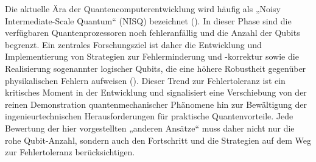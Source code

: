 \newline \newline
Die aktuelle Ära der Quantencomputerentwicklung wird häufig als „Noisy \linebreak Intermediate-Scale Quantum“ (NISQ) bezeichnet (\cite{chengNoisyIntermediatescaleQuantum2023}). In dieser Phase sind die verfügbaren Quantenprozessoren noch fehleranfällig und die Anzahl der Qubits begrenzt. Ein zentrales Forschungsziel ist daher die Entwicklung und Implementierung von Strategien zur Fehlerminderung und -korrektur sowie die Realisierung sogenannter logischer Qubits, die eine höhere Robustheit gegenüber physikalischen Fehlern aufweisen (\cite{QuantumHardwareExplained}). Dieser Trend zur Fehlertoleranz ist ein kritisches Moment in der Entwicklung und signalisiert eine Verschiebung von der reinen Demonstration quantenmechanischer Phänomene hin zur Bewältigung der ingenieurtechnischen Herausforderungen für praktische Quantenvorteile. Jede Bewertung der hier vorgestellten „anderen Ansätze“ muss daher nicht nur die rohe Qubit-Anzahl, sondern auch den Fortschritt und die Strategien auf dem Weg zur Fehlertoleranz berücksichtigen.



% 

% 